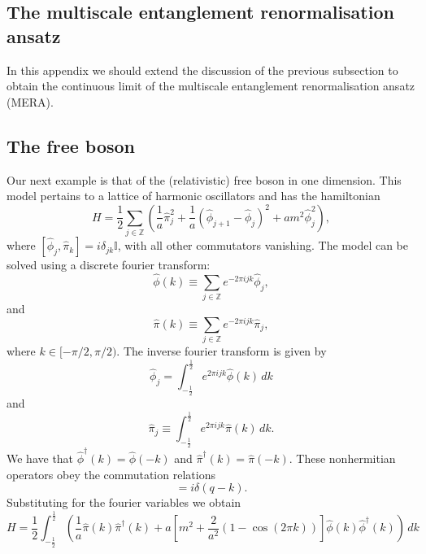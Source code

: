 \documentclass[prl,twocolumn,lengthcheck,superscriptaddress]{revtex4-1}
\theoremstyle{definition}
\theoremstyle{remark}
\begin{document}
\subsection{The multiscale entanglement renormalisation ansatz}
{\color{red} In this appendix we should extend the discussion of the previous subsection to obtain the continuous limit of the multiscale entanglement renormalisation ansatz (MERA).}

\subsection{The free boson}
Our next example is that of the (relativistic) free boson in one dimension. This model pertains to a lattice of harmonic oscillators and has the hamiltonian
\begin{equation}
	H = \frac12\sum_{j\in \mathbb{Z}} \left(\frac{1}{a}\widehat{\pi}_j^2 + \frac{1}{a}(\widehat{\phi}_{j+1}-\widehat{\phi}_{j})^2 + am^2\widehat{\phi}_{j}^2  \right),
\end{equation}
where $[\widehat{\phi}_j, \widehat{\pi}_k] = i\delta_{jk}\mathbb{I}$, with all other commutators vanishing. The model can be solved using a discrete fourier transform:
\begin{equation}
	\widehat{\phi}(k) \equiv \sum_{j\in \mathbb{Z}} e^{-2\pi ijk}\widehat{\phi}_j,
\end{equation}
and
\begin{equation}
	\widehat{\pi}(k) \equiv \sum_{j\in\mathbb{Z}} e^{-2\pi ijk}\widehat{\pi}_j,
\end{equation}
where $k \in [-\pi/2, \pi/2)$. The inverse fourier transform is given by
\begin{equation}
	\widehat{\phi}_j = \int_{-\frac{1}{2}}^{\frac{1}{2}}  e^{2\pi ijk}\widehat{\phi}(k)\, dk
\end{equation}
and
\begin{equation}
	\widehat{\pi}_j \equiv \int_{-\frac{1}{2}}^{\frac{1}{2}}  e^{2\pi ijk}\widehat{\pi}(k)\, dk.
\end{equation}
We have that $\widehat{\phi}^\dag(k) = \widehat{\phi}(-k)$ and $\widehat{\pi}^\dag(k) = \widehat{\pi} (-k)$. These nonhermitian operators obey the commutation relations
\begin{equation}
	[\widehat{\phi}(k), \widehat{\pi}^\dag(q)] = i\delta(q-k).
\end{equation} 
Substituting for the fourier variables we obtain
\begin{equation}
	H = \frac12  \int_{-\frac{1}{2}}^{\frac{1}{2}}  \left(\frac{1}{a}\widehat{\pi} (k)\widehat{\pi}^\dag(k)+ a\left[m^2 + \frac{2}{a^2}\left(1-\cos\left(2\pi k\right)\right)\right] \widehat{\phi}(k)\widehat{\phi}^\dag(k)\right)\,dk
\end{equation}
\end{document}

